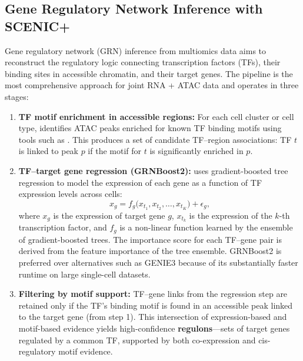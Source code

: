 \subsection{Gene Regulatory Network Inference with SCENIC+}
\label{subsec:multiomics:grn-inference}

Gene regulatory network (GRN) inference from multiomics data aims to reconstruct the regulatory logic connecting transcription factors (TFs), their binding sites in accessible chromatin, and their target genes. The  pipeline is the most comprehensive approach for joint RNA + ATAC data and operates in three stages:

\begin{enumerate}[itemsep=3pt]
  \item \textbf{TF motif enrichment in accessible regions:} For each cell cluster or cell type,  identifies ATAC peaks enriched for known TF binding motifs using tools such as . This produces a set of candidate TF--region associations: TF $t$ is linked to peak $p$ if the motif for $t$ is significantly enriched in $p$.

  \item \textbf{TF--target gene regression (GRNBoost2):}  uses gradient-boosted tree regression to model the expression of each gene as a function of TF expression levels across cells:
  \begin{equation}
    x_g = f_g\bigl(x_{t_1}, x_{t_2}, \ldots, x_{t_K}\bigr) + \epsilon_g,
    \label{eq:multiomics:grnboost2}
  \end{equation}
  where $x_g$ is the expression of target gene $g$, $x_{t_k}$ is the expression of the $k$-th transcription factor, and $f_g$ is a non-linear function learned by the ensemble of gradient-boosted trees. The importance score for each TF--gene pair is derived from the feature importance of the tree ensemble. GRNBoost2 is preferred over alternatives such as GENIE3 because of its substantially faster runtime on large single-cell datasets.

  \item \textbf{Filtering by motif support:} TF--gene links from the regression step are retained only if the TF's binding motif is found in an accessible peak linked to the target gene (from step 1). This intersection of expression-based and motif-based evidence yields high-confidence \textbf{regulons}---sets of target genes regulated by a common TF, supported by both co-expression and cis-regulatory motif evidence.
\end{enumerate}

